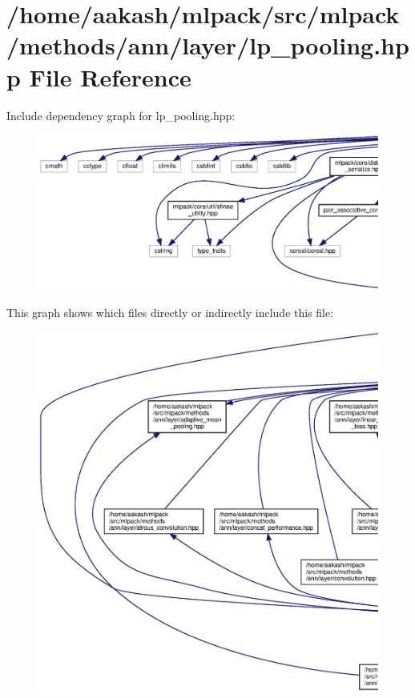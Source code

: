 \section{/home/aakash/mlpack/src/mlpack/methods/ann/layer/lp\+\_\+pooling.hpp File Reference}
\label{lp__pooling_8hpp}
Include dependency graph for lp\+\_\+pooling.\+hpp\+:
\nopagebreak
\begin{figure}[H]
\begin{center}
\leavevmode
\includegraphics[width=350pt]{lp__pooling_8hpp__incl}
\end{center}
\end{figure}
This graph shows which files directly or indirectly include this file\+:
\nopagebreak
\begin{figure}[H]
\begin{center}
\leavevmode
\includegraphics[width=350pt]{lp__pooling_8hpp__dep__incl}
\end{center}
\end{figure}
